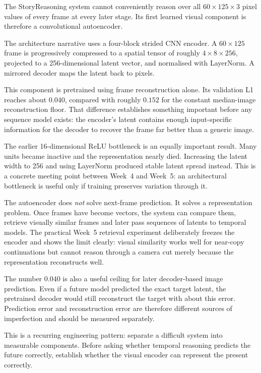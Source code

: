 \begin{architecturebox}
The StoryReasoning system cannot conveniently reason over all \(60\times125\times3\) pixel values of every frame at every later stage. Its first learned visual component is therefore a convolutional autoencoder.

The architecture narrative uses a four-block strided CNN encoder. A \(60\times125\) frame is progressively compressed to a spatial tensor of roughly \(4\times8\times256\), projected to a 256-dimensional latent vector, and normalised with LayerNorm. A mirrored decoder maps the latent back to pixels.

This component is pretrained using frame reconstruction alone. Its validation L1 reaches about \(0.040\), compared with roughly \(0.152\) for the constant median-image reconstruction floor. That difference establishes something important before any sequence model exists: the encoder's latent contains enough input-specific information for the decoder to recover the frame far better than a generic image.

The earlier 16-dimensional ReLU bottleneck is an equally important result. Many units became inactive and the representation nearly died. Increasing the latent width to 256 and using LayerNorm produced stable latent spread instead. This is a concrete meeting point between Week~4 and Week~5: an architectural bottleneck is useful only if training preserves variation through it.

The autoencoder does \emph{not} solve next-frame prediction. It solves a representation problem. Once frames have become vectors, the system can compare them, retrieve visually similar frames and later pass sequences of latents to temporal models. The practical Week~5 retrieval experiment deliberately freezes the encoder and shows the limit clearly: visual similarity works well for near-copy continuations but cannot reason through a camera cut merely because the representation reconstructs well.

The number \(0.040\) is also a useful ceiling for later decoder-based image prediction. Even if a future model predicted the exact target latent, the pretrained decoder would still reconstruct the target with about this error. Prediction error and reconstruction error are therefore different sources of imperfection and should be measured separately.
\end{architecturebox}

This is a recurring engineering pattern: separate a difficult system into measurable components. Before asking whether temporal reasoning predicts the future correctly, establish whether the visual encoder can represent the present correctly.

